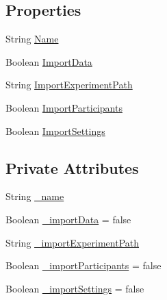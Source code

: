 \subsection*{Properties}
\begin{DoxyCompactItemize}
\item 
String \hyperlink{class_web_analyzer_1_1_events_1_1_create_experiment_event_a6e6e3eee6e63143be6e5ab7b329533c6}{Name}
\item 
Boolean \hyperlink{class_web_analyzer_1_1_events_1_1_create_experiment_event_a23ca6eb22cf95423be8b35c4b200da90}{Import\+Data}
\item 
String \hyperlink{class_web_analyzer_1_1_events_1_1_create_experiment_event_a9b9c24f0a0c60406c0f83ffbeefead50}{Import\+Experiment\+Path}
\item 
Boolean \hyperlink{class_web_analyzer_1_1_events_1_1_create_experiment_event_ac0f034fcfe34ab152d713b42e83c3125}{Import\+Participants}
\item 
Boolean \hyperlink{class_web_analyzer_1_1_events_1_1_create_experiment_event_ad7acdf21b15a8eb496b29b2ee4cd5d35}{Import\+Settings}
\end{DoxyCompactItemize}
\subsection*{Private Attributes}
\begin{DoxyCompactItemize}
\item 
String \hyperlink{class_web_analyzer_1_1_events_1_1_create_experiment_event_a9b05cacff687a5907c457a8ae95164b7}{\+\_\+name}
\item 
Boolean \hyperlink{class_web_analyzer_1_1_events_1_1_create_experiment_event_ae1fce6913b5681e97a9d07978e1faab2}{\+\_\+import\+Data} = false
\item 
String \hyperlink{class_web_analyzer_1_1_events_1_1_create_experiment_event_a8c0fe703fb96fa2fa1f90d2610a8b22a}{\+\_\+import\+Experiment\+Path}
\item 
Boolean \hyperlink{class_web_analyzer_1_1_events_1_1_create_experiment_event_a59d45ed4f6d0829f185a23dca49f6f12}{\+\_\+import\+Participants} = false
\item 
Boolean \hyperlink{class_web_analyzer_1_1_events_1_1_create_experiment_event_a0306b88d62bbb8558674ba1c9c2d1b00}{\+\_\+import\+Settings} = false
\end{DoxyCompactItemize}


